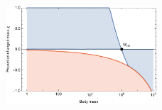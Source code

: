 \documentclass{pnastwo}
\begin{document}
\begin{figure}
\centering
\includegraphics[width=0.5\textwidth]{fig_Invasion.pdf}
\caption{ %
}
\label{fig:invasion}
\end{figure}  
 

% 
% 
%	 
%
%
%
%
%	 
% 
%	
%
\clearpage
\end{document}
